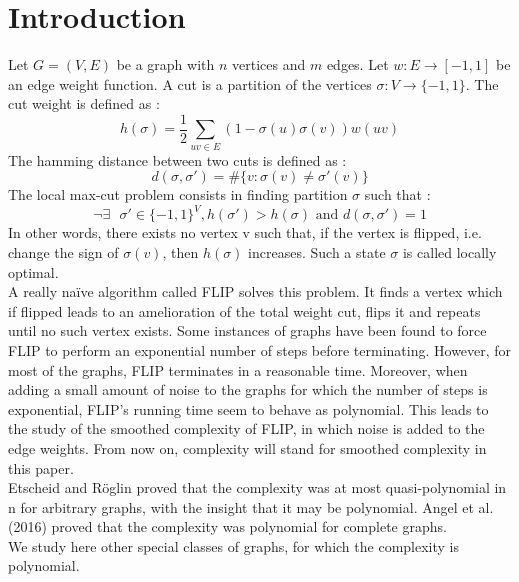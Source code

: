 \section{Introduction}

Let $G = (V,E)$ be a graph with $n$ vertices and $m$ edges.  Let $w : E \rightarrow [-1, 1]$ be an edge weight function. A cut is a partition of the vertices $\sigma : V \rightarrow \{-1, 1\}$. The cut weight is defined as :
\begin{equation*}
h(\sigma) = \dfrac{1}{2}\sum_{uv \in E}(1 - \sigma(u)\sigma(v))w(uv)
\end{equation*}
The hamming distance between two cuts is defined as :
\begin{equation*}
d(\sigma, \sigma') = \#\{v : \sigma(v) \neq \sigma'(v)\}
\end{equation*}
The local max-cut problem consists in finding  partition $\sigma$ such that :
\begin{equation*}
\neg \exists \text{  }\sigma' \in \{-1, 1\}^V,  h(\sigma') > h(\sigma) \text{ and } d(\sigma, \sigma') = 1
\end{equation*}
In other words, there exists no vertex v such that, if the vertex is flipped, i.e. change the sign of $\sigma(v)$, then $h(\sigma)$ increases. Such a state $\sigma$ is called locally optimal. \\ 

A really naïve algorithm called FLIP solves this problem. It finds a vertex which if flipped leads to an amelioration of the total weight cut, flips it and repeats until no such vertex exists. Some instances of graphs have been found to force FLIP to perform an exponential number of steps before terminating. However, for most of the graphs, FLIP terminates in a reasonable time. Moreover, when adding a small amount of noise to the graphs for which the number of steps is exponential, FLIP's running time seem to behave as polynomial. This leads to the study of the smoothed complexity of FLIP, in which noise is added to the edge weights. From now on, complexity will stand for smoothed complexity in this paper. \\

Etscheid and Röglin \cite{etscheid2017smoothed} proved that the complexity was at most quasi-polynomial in n for arbitrary graphs, with the insight that it may be polynomial. Angel et al. (2016) \cite{angel2016local} proved that the complexity was polynomial for complete graphs. \\
We study here other special classes of graphs, for which the complexity is polynomial.